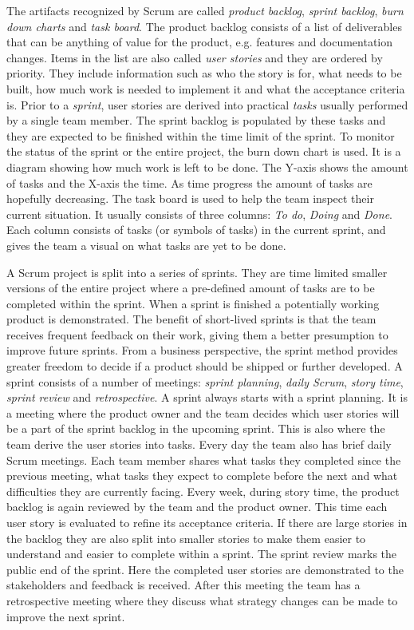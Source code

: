 The artifacts recognized by Scrum are called \textit{product backlog},
\textit{sprint backlog}, \textit{burn down charts} and \textit{task board}. The
product backlog consists of a list of deliverables that can be anything of
value for the product, e.g. features and documentation changes. Items in the
list are also called \textit{user stories} and they are ordered by priority.
They include information such as who the story is for, what needs to be built,
how much work is needed to implement it and what the acceptance criteria is.
Prior to a \textit{sprint}, user stories are derived into practical
\textit{tasks} usually performed by a single team member. The sprint backlog is
populated by these tasks and they are expected to be finished within the time
limit of the sprint. To monitor the status of the sprint or the entire project,
the burn down chart is used. It is a diagram showing how much work is left to
be done.  The Y-axis shows the amount of tasks and the X-axis the time. As time
progress the amount of tasks are hopefully decreasing. The task board is used
to help the team inspect their current situation. It usually consists of three
columns: \textit{To do}, \textit{Doing} and \textit{Done}. Each column consists
of tasks (or symbols of tasks) in the current sprint, and gives the team a
visual on what tasks are yet to be done. \cite{sims2012scrum}

A Scrum project is split into a series of sprints. They are time limited
smaller versions of the entire project where a pre-defined amount of tasks are
to be completed within the sprint. When a sprint is finished a potentially
working product is demonstrated. The benefit of short-lived sprints is that the
team receives frequent feedback on their work, giving them a better presumption
to improve future sprints. From a business perspective, the sprint method
provides greater freedom to decide if a product should be shipped or further
developed. A sprint consists of a number of meetings: \textit{sprint planning},
\textit{daily Scrum}, \textit{story time}, \textit{sprint review} and
\textit{retrospective}. A sprint always starts with a sprint planning. It is a
meeting where the product owner and the team decides which user stories will be
a part of the sprint backlog in the upcoming sprint. This is also where the
team derive the user stories into tasks. Every day the team also has brief
daily Scrum meetings. Each team member shares what tasks they completed since
the previous meeting, what tasks they expect to complete before the next and
what difficulties they are currently facing. Every week, during story time, the
product backlog is again reviewed by the team and the product owner. This time
each user story is evaluated to refine its acceptance criteria. If there are
large stories in the backlog they are also split into smaller stories to make
them easier to understand and easier to complete within a sprint. The sprint
review marks the public end of the sprint. Here the completed user stories are
demonstrated to the stakeholders and feedback is received. After this meeting
the team has a retrospective meeting where they discuss what strategy changes
can be made to improve the next sprint. \cite{sims2012scrum}

